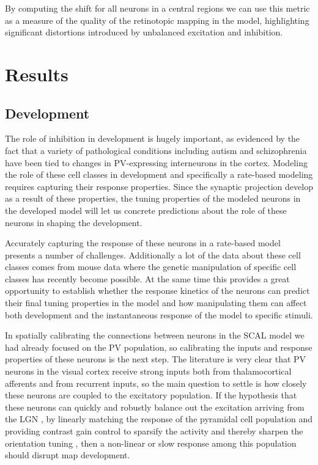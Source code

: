 By computing the shift for all neurons in a central regions we can use
this metric as a measure of the quality of the retinotopic mapping in
the model, highlighting significant distortions introduced by
unbalanced excitation and inhibition.

\section{Results}

\subsection{Development}

The role of inhibition in development is hugely important, as
evidenced by the fact that a variety of pathological conditions
including autism \citep{Wohr2015} and schizophrenia \citep{Lewis2012}
have been tied to changes in PV-expressing interneurons in the
cortex. Modeling the role of these cell classes in development and
specifically a rate-based modeling requires capturing their response
properties. Since the synaptic projection develop as a result of these
properties, the tuning properties of the modeled neurons in the
developed model will let us concrete predictions about the role of
these neurons in shaping the development.

Accurately capturing the response of these neurons in a rate-based
model presents a number of challenges. Additionally a lot of the data
about these cell classes comes from mouse data where the genetic
manipulation of specific cell classes has recently become possible. At
the same time this provides a great opportunity to establish whether
the response kinetics of the neurons can predict their final tuning
properties in the model and how manipulating them can affect both
development and the instantaneous response of the model to specific
stimuli.

In spatially calibrating the connections between neurons in the SCAL
model we had already focused on the PV population, so calibrating the
inputs and response properties of these neurons is the next step. The
literature is very clear that PV neurons in the visual cortex receive
strong inputs both from thalamocortical afferents and from recurrent
inputs, so the main question to settle is how closely these neurons
are coupled to the excitatory population. If the hypothesis that these
neurons can quickly and robustly balance out the excitation arriving
from the LGN \citep{Swadlow2003, Burkhalter2008}, by linearly matching
the response of the pyramidal cell population and providing contrast
gain control to sparsify the activity and thereby sharpen the
orientation tuning \citep{Wilson2012}, then a non-linear or slow
response among this population should disrupt map development.

